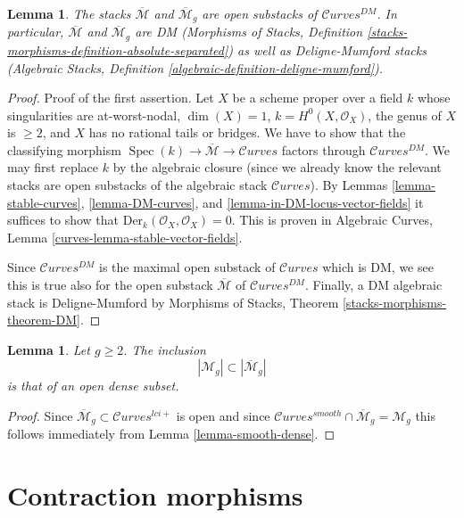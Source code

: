 \documentclass{stacks-project}
\theoremstyle{plain}
\newtheorem{lemma}[subsection]{Lemma}
\theoremstyle{definition}
\theoremstyle{remark}
\numberwithin{equation}{subsection}
\def\Spec{\mathop{\mathrm{Spec}}}
\def\Curvesstack{\mathcal{C}\!\mathit{urves}}
\begin{document}
\begin{lemma}
\label{lemma-stable-curves-deligne-mumford}
The stacks $\overline{\mathcal{M}}$ and
$\overline{\mathcal{M}}_g$
are open substacks of $\Curvesstack^{DM}$.
In particular, $\overline{\mathcal{M}}$ and
$\overline{\mathcal{M}}_g$ are DM
(Morphisms of Stacks, Definition
\ref{stacks-morphisms-definition-absolute-separated})
as well as Deligne-Mumford stacks
(Algebraic Stacks, Definition \ref{algebraic-definition-deligne-mumford}).
\end{lemma}

\begin{proof}
Proof of the first assertion.
Let $X$ be a scheme proper over a field $k$ whose singularities
are at-worst-nodal, $\dim(X) = 1$, $k = H^0(X, \mathcal{O}_X)$,
the genus of $X$ is $\geq 2$, and $X$ has no rational tails or bridges.
We have to show that the classifying morphism
$\Spec(k) \to \overline{\mathcal{M}} \to \Curvesstack$
factors through $\Curvesstack^{DM}$.
We may first replace $k$ by the algebraic closure
(since we already know the relevant stacks are open
substacks of the algebraic stack $\Curvesstack$).
By Lemmas \ref{lemma-stable-curves}, \ref{lemma-DM-curves}, and
\ref{lemma-in-DM-locus-vector-fields} it suffices to show that
$\text{Der}_k(\mathcal{O}_X, \mathcal{O}_X) = 0$.
This is proven in
Algebraic Curves, Lemma \ref{curves-lemma-stable-vector-fields}.

\medskip\noindent
Since $\Curvesstack^{DM}$ is the maximal open substack of
$\Curvesstack$ which is DM, we see this is true also for the
open substack $\overline{\mathcal{M}}$ of $\Curvesstack^{DM}$.
Finally, a DM algebraic stack is Deligne-Mumford by
Morphisms of Stacks, Theorem \ref{stacks-morphisms-theorem-DM}.
\end{proof}

\begin{lemma}
\label{lemma-smooth-dense-in-stable}
Let $g \geq 2$. The inclusion
$$
|\mathcal{M}_g| \subset |\overline{\mathcal{M}}_g|
$$
is that of an open dense subset.
\end{lemma}

\begin{proof}
Since $\overline{\mathcal{M}}_g \subset \Curvesstack^{lci+}$
is open and since
$\Curvesstack^{smooth} \cap \overline{\mathcal{M}}_g = \mathcal{M}_g$
this follows immediately from
Lemma \ref{lemma-smooth-dense}.
\end{proof}




\section{Contraction morphisms}
\label{section-contracting}
\end{document}
